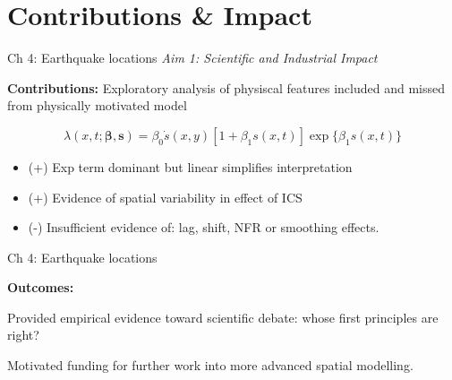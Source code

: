 \documentclass[10pt]{beamer}
\begin{document}
\section{Contributions \& Impact}

\begin{frame}{Ch 4: Earthquake locations}
\textit{\color{orange} Aim 1: Scientific and Industrial Impact}

\textbf{Contributions:}
Exploratory analysis of physiscal features included and missed from physically motivated model

\vspace{1em}

$$ \lambda(x,t; \bm{\beta}, \bm{s}) = \beta_0 \dot s(x,y)[1 + \beta_1 s(x,t)]\exp\{\beta_1 s(x,t)\} $$

\vspace{2em}

\begin{itemize}
    \item (+) Exp term dominant but linear simplifies interpretation 
    \item (+) Evidence of spatial variability in effect of ICS 
    \item (-) Insufficient evidence of: lag, shift, NFR or smoothing effects. 
\end{itemize}
\end{frame}



\begin{frame}{Ch 4: Earthquake locations}

\textbf{Outcomes:}

\vspace{2em}

Provided empirical evidence toward scientific debate: whose first principles are right? 

\vspace{2em}

Motivated funding for further work into more advanced spatial modelling.

\end{frame}
\end{document}
